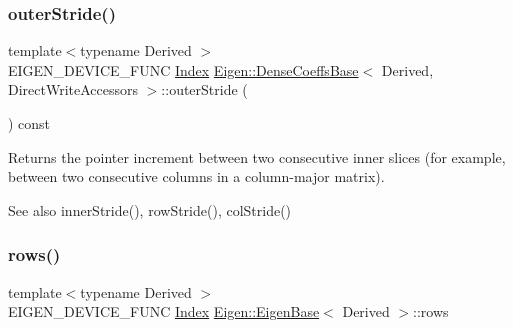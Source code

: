 \subsubsection{\texorpdfstring{outerStride()}{outerStride()}}
{\footnotesize\ttfamily template$<$typename Derived $>$ \\
E\+I\+G\+E\+N\+\_\+\+D\+E\+V\+I\+C\+E\+\_\+\+F\+U\+NC \mbox{\hyperlink{struct_eigen_1_1_eigen_base_a554f30542cc2316add4b1ea0a492ff02}{Index}} \mbox{\hyperlink{class_eigen_1_1_dense_coeffs_base}{Eigen\+::\+Dense\+Coeffs\+Base}}$<$ Derived, Direct\+Write\+Accessors $>$\+::outer\+Stride (\begin{DoxyParamCaption}{ }\end{DoxyParamCaption}) const\hspace{0.3cm}{\ttfamily [inline]}}

\begin{DoxyReturn}{Returns}
the pointer increment between two consecutive inner slices (for example, between two consecutive columns in a column-\/major matrix).
\end{DoxyReturn}
\begin{DoxySeeAlso}{See also}
inner\+Stride(), row\+Stride(), col\+Stride() 
\end{DoxySeeAlso}
\mbox{\label{class_eigen_1_1_dense_coeffs_base_3_01_derived_00_01_direct_write_accessors_01_4_a8141320ba8df384426c298b32b000d8e}} 
\subsubsection{\texorpdfstring{rows()}{rows()}}
{\footnotesize\ttfamily template$<$typename Derived $>$ \\
E\+I\+G\+E\+N\+\_\+\+D\+E\+V\+I\+C\+E\+\_\+\+F\+U\+NC \mbox{\hyperlink{struct_eigen_1_1_eigen_base_a554f30542cc2316add4b1ea0a492ff02}{Index}} \mbox{\hyperlink{struct_eigen_1_1_eigen_base}{Eigen\+::\+Eigen\+Base}}$<$ Derived $>$\+::rows\hspace{0.3cm}{\ttfamily [inline]}}

